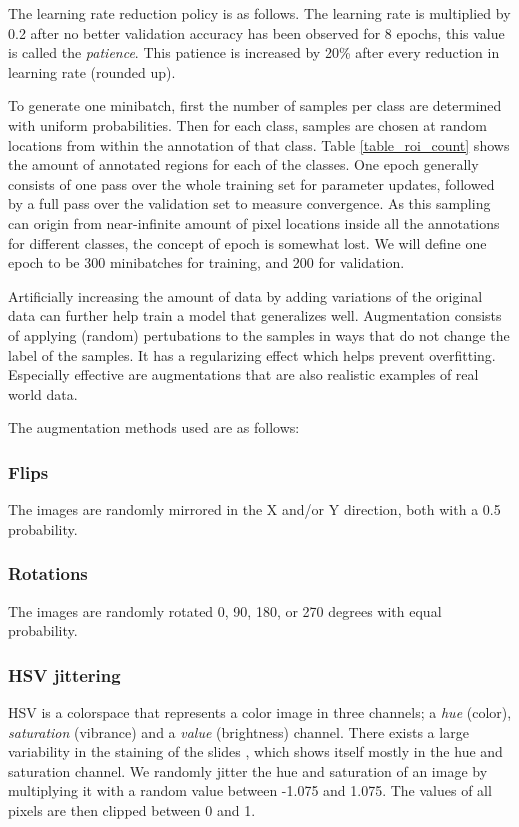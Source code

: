 \documentclass[journal]{IEEEtran}
\begin{document}
The learning rate reduction policy is as follows. The learning rate is multiplied by 0.2 after no better validation accuracy has been observed for 8 epochs, this value is called the \emph{patience}. This patience is increased by 20\% after every reduction in learning rate (rounded up).  

To generate one minibatch, first the number of samples per class are determined with uniform probabilities. Then for each class, samples are chosen at random locations from within the annotation of that class. Table \ref{table_roi_count} shows the amount of annotated regions for each of the classes. One epoch generally consists of one pass over the whole training set for parameter updates, followed by a full pass over the validation set to measure convergence. As this sampling can origin from near-infinite amount of pixel locations inside all the annotations for different classes, the concept of epoch is somewhat lost. We will define one epoch to be 300 minibatches for training, and 200 for validation. 

Artificially increasing the amount of data by adding variations of the original data can further help train a model that generalizes well. Augmentation consists of applying (random) pertubations to the samples in ways that do not change the label of the samples. It has a regularizing effect which helps prevent overfitting. Especially effective are augmentations that are also realistic examples of real world data.

\medskip

The augmentation methods used are as follows:

\subsubsection{Flips}
The images are randomly mirrored in the X and/or Y direction, both with a 0.5 probability. 

\subsubsection{Rotations}
The images are randomly rotated 0, 90, 180, or 270 degrees with equal probability.

\subsubsection{HSV jittering}
HSV is a colorspace that represents a color image in three channels; a \emph{hue} (color), \emph{saturation} (vibrance) and a \emph{value} (brightness) channel. There exists a large variability in the staining of the slides \cite{bejnordi2014quantitative}, which shows itself mostly in the hue and saturation channel. We randomly jitter the hue and saturation of an image by multiplying it with a random value between -1.075 and 1.075. The values of all pixels are then clipped between 0 and 1.
\end{document}
